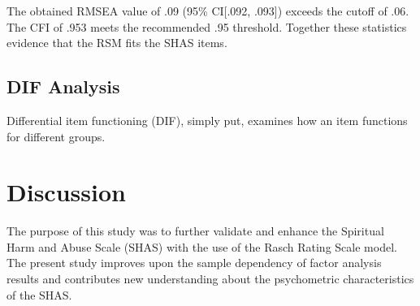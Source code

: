 \documentclass[
]{article}
\begin{document}
The obtained RMSEA value of .09 (95\% CI{[}.092, .093{]}) exceeds the cutoff of .06. The CFI of .953 meets the recommended .95 threshold. Together these statistics evidence that the RSM fits the SHAS items.

\hypertarget{dif-analysis}{%
\subsection{DIF Analysis}\label{dif-analysis}}

Differential item functioning (DIF), simply put, examines how an item functions for different groups.

\hypertarget{discussion}{%
\section{Discussion}\label{discussion}}

The purpose of this study was to further validate and enhance the Spiritual Harm and Abuse Scale (SHAS) with the use of the Rasch Rating Scale model. The present study improves upon the sample dependency of factor analysis results and contributes new understanding about the psychometric characteristics of the SHAS.
\end{document}
